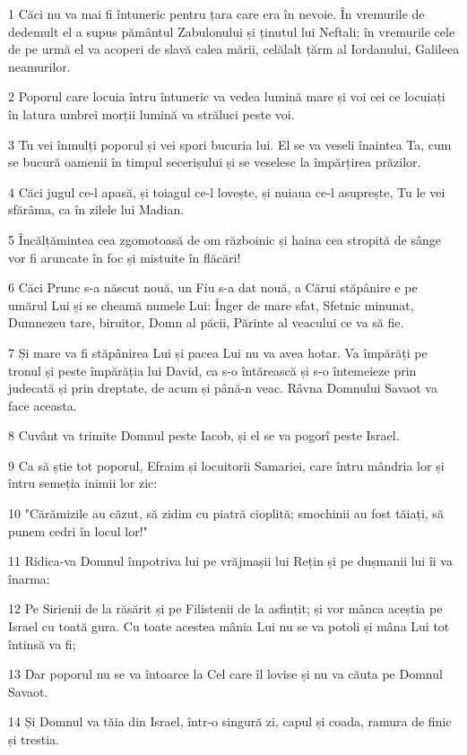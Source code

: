 \par 1 Căci nu va mai fi întuneric pentru țara care era în nevoie. În vremurile de dedemult el a supus pământul Zabulonului și ținutul lui Neftali; în vremurile cele de pe urmă el va acoperi de slavă calea mării, celălalt țărm al Iordanului, Galileea neamurilor.
\par 2 Poporul care locuia întru întuneric va vedea lumină mare și voi cei ce locuiați în latura umbrei morții lumină va străluci peste voi.
\par 3 Tu vei înmulți poporul și vei spori bucuria lui. El se va veseli înaintea Ta, cum se bucură oamenii în timpul secerișului și se veselesc la împărțirea prăzilor.
\par 4 Căci jugul ce-l apasă, și toiagul ce-l lovește, și nuiaua ce-l asuprește, Tu le vei sfărâma, ca în zilele lui Madian.
\par 5 Încălțămintea cea zgomotoasă de om războinic și haina cea stropită de sânge vor fi aruncate în foc și mistuite în flăcări!
\par 6 Căci Prunc s-a născut nouă, un Fiu s-a dat nouă, a Cărui stăpânire e pe umărul Lui și se cheamă numele Lui: Înger de mare sfat, Sfetnic minunat, Dumnezeu tare, biruitor, Domn al păcii, Părinte al veacului ce va să fie.
\par 7 Și mare va fi stăpânirea Lui și pacea Lui nu va avea hotar. Va împărăți pe tronul și peste împărăția lui David, ca s-o întărească și s-o întemeieze prin judecată și prin dreptate, de acum și până-n veac. Râvna Domnului Savaot va face aceasta.
\par 8 Cuvânt va trimite Domnul peste Iacob, și el se va pogorî peste Israel.
\par 9 Ca să știe tot poporul, Efraim și locuitorii Samariei, care întru mândria lor și întru semeția inimii lor zic:
\par 10 "Cărămizile au căzut, să zidim cu piatră cioplită; smochinii au fost tăiați, să punem cedri în locul lor!"
\par 11 Ridica-va Domnul împotriva lui pe vrăjmașii lui Rețin și pe dușmanii lui îi va înarma:
\par 12 Pe Sirienii de la răsărit și pe Filistenii de la asfințit; și vor mânca aceștia pe Israel cu toată gura. Cu toate acestea mânia Lui nu se va potoli și mâna Lui tot întinsă va fi;
\par 13 Dar poporul nu se va întoarce la Cel care îl lovise și nu va căuta pe Domnul Savaot.
\par 14 Și Domnul va tăia din Israel, într-o singură zi, capul și coada, ramura de finic și trestia.
